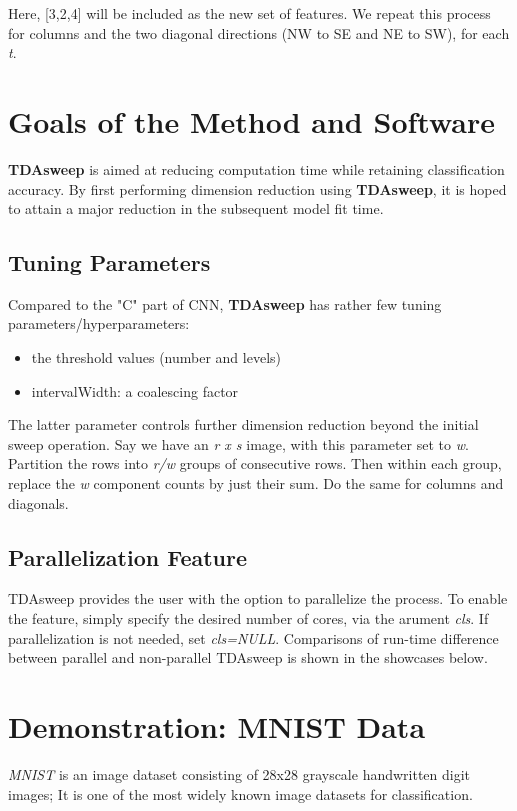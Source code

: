 \documentclass{article}
\begin{document}
Here, [3,2,4] will be included as the new set of features. We repeat this process for columns and the two diagonal directions (NW to SE and NE to SW), for each \emph{t}.

\section{Goals of the Method and Software}
\textbf{TDAsweep} is aimed at reducing computation time while retaining classification accuracy. By first performing dimension reduction using \textbf{TDAsweep}, it is hoped to attain a major reduction in the subsequent model fit time.

\subsection*{Tuning Parameters}
Compared to the "C" part of CNN, \textbf{TDAsweep} has rather few tuning parameters/hyperparameters:

\begin{itemize}
    \item the threshold values (number and levels)
    \item intervalWidth: a coalescing factor
    
\end{itemize}
The latter parameter controls further dimension reduction beyond the initial sweep operation. Say we have an \emph{r x s} image, with this parameter set to \emph{w}. Partition the rows into \emph{r/w} groups of consecutive rows. Then within each group, replace the \emph{w} component counts by just their sum. Do the same for columns and diagonals.


\subsection{Parallelization Feature}
TDAsweep provides the user with the option to parallelize the process. To enable the feature, simply specify the desired number of cores, via the arument \emph{cls}. If parallelization is not needed, set \emph{cls=NULL}. Comparisons of run-time difference between parallel and non-parallel TDAsweep is shown in the showcases below.


\section{Demonstration: MNIST Data}

\emph{MNIST} is an image dataset consisting of 28x28 grayscale handwritten digit images; It is one of the most widely known image datasets for classification.
\end{document}

